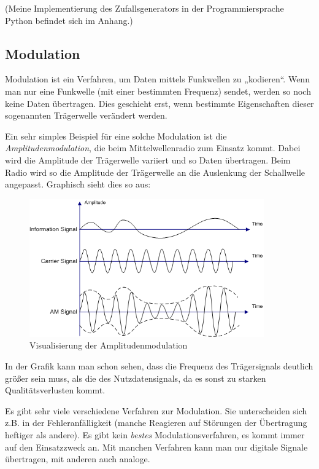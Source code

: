 \documentclass[12pt,a4paper]{scrartcl}
\begin{document}
(Meine Implementierung des Zufallsgenerators in der Programmiersprache Python befindet sich im Anhang.)

\subsection{Modulation}

Modulation ist ein Verfahren, um Daten mittels Funkwellen zu „kodieren“.
Wenn man nur eine Funkwelle (mit einer bestimmten Frequenz) sendet, werden so noch keine Daten übertragen. Dies geschieht erst, wenn bestimmte Eigenschaften dieser sogenannten Trägerwelle verändert werden.

Ein sehr simples Beispiel für eine solche Modulation ist die \emph{Amplitudenmodulation}, die beim Mittelwellenradio zum Einsatz kommt. Dabei wird die Amplitude der Trägerwelle variiert und so Daten übertragen. Beim Radio wird so die Amplitude der Trägerwelle an die Auslenkung der Schallwelle angepasst. Graphisch sieht dies so aus:

\begin{figure}[H]
\centering
\includegraphics[width=0.9\textwidth]{img/Illustration_of_Amplitude_Modulation.png}
\caption{Visualisierung der Amplitudenmodulation\cite{commons_am}}
\label{fig:am}
\end{figure}

In der Grafik kann man schon sehen, dass die Frequenz des Trägersignals deutlich größer sein muss, als die des Nutzdatensignals, da es sonst zu starken Qualitätsverlusten kommt.

Es gibt sehr viele verschiedene Verfahren zur Modulation. Sie unterscheiden sich z.B. in der Fehleranfälligkeit (manche Reagieren auf Störungen der Übertragung heftiger als andere). Es gibt kein \emph{bestes} Modulationsverfahren, es kommt immer auf den Einsatzzweck an. Mit manchen Verfahren kann man nur digitale Signale übertragen, mit anderen auch analoge.
\end{document}
